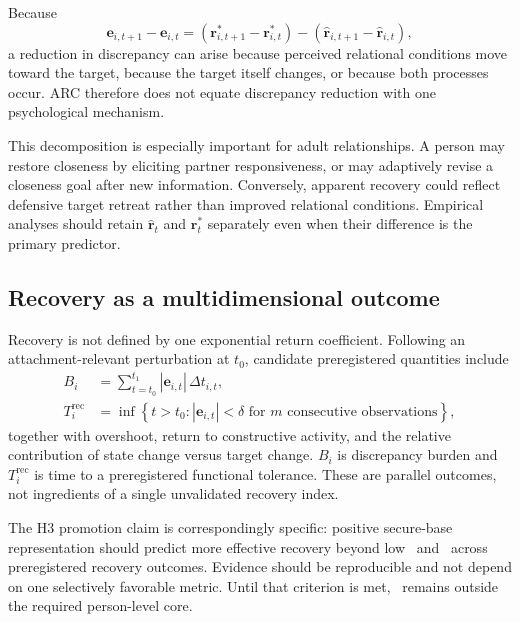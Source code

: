 Because
\begin{equation}
\mathbf e_{i,t+1}-\mathbf e_{i,t}
=
\left(\mathbf r^\ast_{i,t+1}-\mathbf r^\ast_{i,t}\right)
-
\left(\hat{\mathbf r}_{i,t+1}-\hat{\mathbf r}_{i,t}\right),
\label{eq:discrepancy-decomposition}
\end{equation}
a reduction in discrepancy can arise because perceived relational conditions move toward the target, because the target itself changes, or because both processes occur. ARC therefore does not equate discrepancy reduction with one psychological mechanism.

This decomposition is especially important for adult relationships. A person may restore closeness by eliciting partner responsiveness, or may adaptively revise a closeness goal after new information. Conversely, apparent recovery could reflect defensive target retreat rather than improved relational conditions. Empirical analyses should retain \(\hat{\mathbf r}_t\) and \(\mathbf r^\ast_t\) separately even when their difference is the primary predictor.

\subsection{Recovery as a multidimensional outcome}

Recovery is not defined by one exponential return coefficient. Following an attachment-relevant perturbation at \(t_0\), candidate preregistered quantities include
\begin{align}
B_i &= \sum_{t=t_0}^{t_1} |\mathbf e_{i,t}|\,\Delta t_{i,t},
\\
T^{\mathrm{rec}}_i
&=
\inf\left\{
t>t_0:
|\mathbf e_{i,t}|<\delta
\text{ for }m\text{ consecutive observations}
\right\},
\end{align}
together with overshoot, return to constructive activity, and the relative contribution of state change versus target change. \(B_i\) is discrepancy burden and \(T^{\mathrm{rec}}_i\) is time to a preregistered functional tolerance. These are parallel outcomes, not ingredients of a single unvalidated recovery index.

The H3 promotion claim is correspondingly specific: positive secure-base representation should predict more effective recovery beyond low \Anx\ and \Avo\ across preregistered recovery outcomes. Evidence should be reproducible and not depend on one selectively favorable metric. Until that criterion is met, \Sec\ remains outside the required person-level core.

